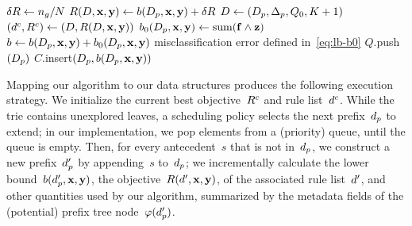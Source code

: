 \begin{algorithm}[t!]
\begin{algorithmic}
       \Else
           \State $\delta R \gets n_g / N$ 
       \EndIf
       \State $R({D}, \mathbf{x}, \mathbf{y}) \gets b(D_p, \mathbf{x}, \mathbf{y}) + \delta R$ 
       \State ${D} \gets (D_p, \Delta_p, Q_0, K+1)$ 
       \If {$\Obj(\RLB, \x, \y) < \CurrentObj$}
           \State $(d^c, {R^c}) \gets ({D}, R({D}, \mathbf{x}, \mathbf{y}))$ 
        \EndIf
        \State $b_0(D_p, \mathbf{x}, \mathbf{y}) \gets \textnormal{sum}(\mathbf{f} \wedge \mathbf{z})$ 
        \State $b \gets b(D_p, \mathbf{x}, \mathbf{y}) + b_0(D_p, \mathbf{x}, \mathbf{y})$ \hfill misclassification error defined in~\eqref{eq:lb-b0}
            \State \Continue {}
        \EndIf
         
            \State $Q$.push$(D_p)$ 
            \State $C$.insert$(D_p, b(D_p, \mathbf{x}, \mathbf{y}))$ 
        \EndIf
    \EndIf
\EndFor
\end{algorithmic}
\end{algorithm}

Mapping our algorithm to our data structures produces the following execution strategy.
%
We initialize the current best objective~${R^c}$ and rule list~$d^c$.
%
While the trie contains unexplored leaves, a scheduling policy selects the next prefix~$d_p$
to extend; in our implementation, we pop elements from a (priority) queue, until the queue is empty.
%
Then, for every antecedent~$s$ that is not in~$d_p$,
we construct a new prefix~$d_p'$ by appending~$s$ to~$d_p$;
we incrementally calculate the lower bound~$b(d_p', \mathbf{x}, \mathbf{y})$,
the objective~$R({d}', \mathbf{x}, \mathbf{y})$, of the associated rule list~${d}'$,
and other quantities used by our algorithm, summarized by the metadata fields of
the (potential) prefix tree node~$\varphi(d_p')$.

